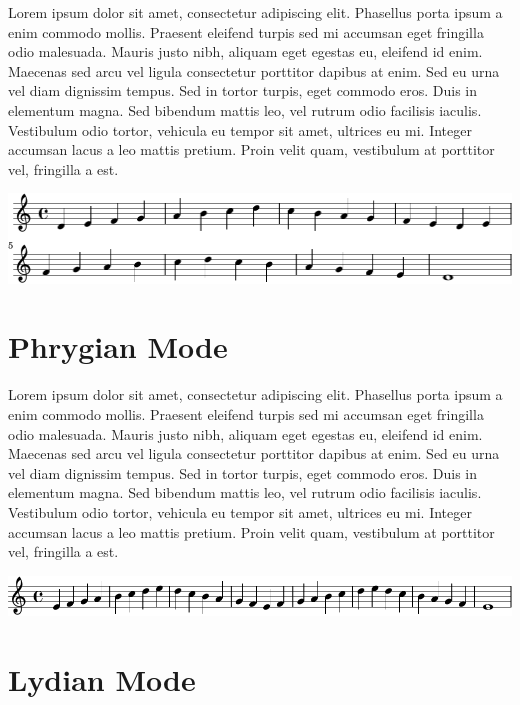 \documentclass[11pt]{article}
\begin{document}
Lorem ipsum dolor sit amet, consectetur adipiscing elit. Phasellus
porta ipsum a enim commodo mollis. Praesent eleifend turpis sed mi
accumsan eget fringilla odio malesuada. Mauris justo nibh, aliquam
eget egestas eu, eleifend id enim. Maecenas sed arcu vel ligula
consectetur porttitor dapibus at enim. Sed eu urna vel diam dignissim
tempus. Sed in tortor turpis, eget commodo eros. Duis in elementum
magna. Sed bibendum mattis leo, vel rutrum odio facilisis iaculis.
Vestibulum odio tortor, vehicula eu tempor sit amet, ultrices eu mi.
Integer accumsan lacus a leo mattis pretium. Proin velit quam,
vestibulum at porttitor vel, fringilla a est.

\begin{center}
\includegraphics[width=.9\linewidth]{dorian.pdf}
\end{center}

\section*{Phrygian Mode}
\label{sec:org34b015f}

Lorem ipsum dolor sit amet, consectetur adipiscing elit. Phasellus
porta ipsum a enim commodo mollis. Praesent eleifend turpis sed mi
accumsan eget fringilla odio malesuada. Mauris justo nibh, aliquam
eget egestas eu, eleifend id enim. Maecenas sed arcu vel ligula
consectetur porttitor dapibus at enim. Sed eu urna vel diam dignissim
tempus. Sed in tortor turpis, eget commodo eros. Duis in elementum
magna. Sed bibendum mattis leo, vel rutrum odio facilisis iaculis.
Vestibulum odio tortor, vehicula eu tempor sit amet, ultrices eu mi.
Integer accumsan lacus a leo mattis pretium. Proin velit quam,
vestibulum at porttitor vel, fringilla a est.

\begin{center}
\includegraphics[width=.9\linewidth]{phrygian.pdf}
\end{center}

\section*{Lydian Mode}
\label{sec:org22ea8a5}
\end{document}
